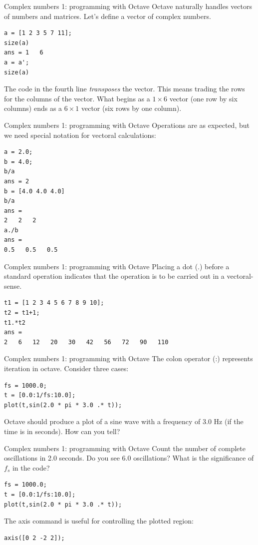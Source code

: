 \documentclass{beamer}
\begin{document}
\begin{frame}[fragile]{Complex numbers 1: programming with Octave}
Octave naturally handles vectors of numbers and matrices.  Let's define a vector of complex numbers. \\
\begin{verbatim}
a = [1 2 3 5 7 11];
size(a)
ans = 1   6
a = a';
size(a)
\end{verbatim}
The code in the fourth line \textit{transposes} the vector.  This means trading the rows for the columns of the vector.  What begins as a $1 \times 6$ vector (one row by six columns) ends as a $6 \times 1$ vector (six rows by one column).
\end{frame}

\begin{frame}[fragile]{Complex numbers 1: programming with Octave}
Operations are as expected, but we need special notation for vectoral calculations:
\begin{verbatim}
a = 2.0;
b = 4.0;
b/a
ans = 2
b = [4.0 4.0 4.0]
b/a
ans =
2   2   2
a./b
ans =
0.5   0.5   0.5
\end{verbatim}
\end{frame}

\begin{frame}[fragile]{Complex numbers 1: programming with Octave}
Placing a dot (.) before a standard operation indicates that the operation is to be carried out in a vectoral-sense.
\begin{verbatim}
t1 = [1 2 3 4 5 6 7 8 9 10];
t2 = t1+1;
t1.*t2
ans =
2   6   12   20   30   42   56   72   90   110
\end{verbatim}
\end{frame}

\begin{frame}[fragile]{Complex numbers 1: programming with Octave}
The colon operator (:) represents iteration in octave.  Consider three cases:  \\
\begin{verbatim}
fs = 1000.0;
t = [0.0:1/fs:10.0];
plot(t,sin(2.0 * pi * 3.0 .* t));
\end{verbatim}
Octave should produce a plot of a sine wave with a frequency of 3.0 Hz (if the time is in seconds).  How can you tell?
\end{frame}

\begin{frame}[fragile]{Complex numbers 1: programming with Octave}
Count the number of complete oscillations in 2.0 seconds.  Do you see 6.0 oscillations?  What is the significance of $f_s$ in the code?
\begin{verbatim}
fs = 1000.0;
t = [0.0:1/fs:10.0];
plot(t,sin(2.0 * pi * 3.0 .* t));
\end{verbatim}
The \alert{axis} command is useful for controlling the plotted region:
\begin{verbatim}
axis([0 2 -2 2]);
\end{verbatim}
\end{frame}
\end{document}
